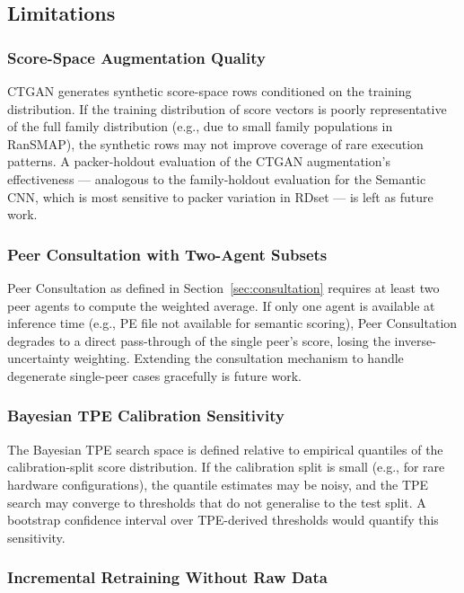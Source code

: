 \documentclass[journal]{IEEEtran}
\begin{document}
\subsection{Limitations}

\subsubsection{Score-Space Augmentation Quality}

CTGAN generates synthetic score-space rows conditioned on the training
distribution.
If the training distribution of score vectors is poorly representative
of the full family distribution (e.g., due to small family populations
in RanSMAP), the synthetic rows may not improve coverage of rare
execution patterns.
A packer-holdout evaluation of the CTGAN augmentation's effectiveness
--- analogous to the family-holdout evaluation for the Semantic CNN,
which is most sensitive to packer variation in RDset ---
is left as future work.

\subsubsection{Peer Consultation with Two-Agent Subsets}

Peer Consultation as defined in Section~\ref{sec:consultation} requires
at least two peer agents to compute the weighted average.
If only one agent is available at inference time (e.g., PE file not
available for semantic scoring), Peer Consultation degrades to a direct
pass-through of the single peer's score, losing the inverse-uncertainty
weighting.
Extending the consultation mechanism to handle degenerate single-peer
cases gracefully is future work.

\subsubsection{Bayesian TPE Calibration Sensitivity}

The Bayesian TPE search space is defined relative to empirical
quantiles of the calibration-split score distribution.
If the calibration split is small (e.g., for rare hardware configurations),
the quantile estimates may be noisy, and the TPE search may converge to
thresholds that do not generalise to the test split.
A bootstrap confidence interval over TPE-derived thresholds would
quantify this sensitivity.

\subsubsection{Incremental Retraining Without Raw Data}
\end{document}
